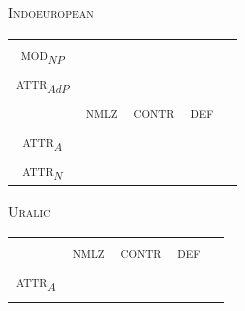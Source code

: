 {\begin{figure}[htbp]
\parbox[b]{0.5\textwidth}{
\begin{center}\textsc{Indoeuropean}\\
\medskip
\begin{tabular}{| c || c | c | c | c}
\cline{1-1}
\textsc{mod}$_{NP}$\\
\cline{1-1}
\textsc{attr}$_{AdP}$\\
\hline
 & \textsc{nmlz} & \textsc{contr} & \textsc{def}\\
\hline
\textsc{attr}$_{A}$\\
\cline{1-1}
\textsc{attr}$_{N}$\\
\cline{1-1}
\end{tabular}
\end{center}
}
\parbox[b]{0.5\textwidth}{
\begin{center}\textsc{Uralic}\\
\medskip
\begin{tabular}{| c || c | c | c | c}
\cline{1-1}
\\
\cline{1-1}
\\
\hline
 & \textsc{nmlz} & \textsc{contr} & \textsc{def}\\
\hline
\textsc{attr}$_{A}$\\
\cline{1-1}
\\
\cline{1-1}
\end{tabular}
\end{center}
}


\end{figure}}
